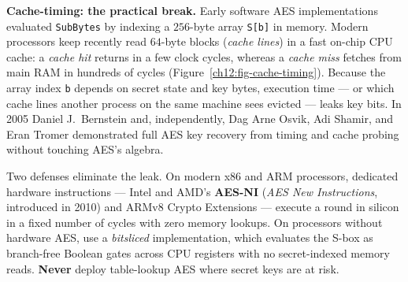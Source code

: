 \begin{attackbox}
\textbf{Cache-timing: the practical break.} Early software AES implementations
evaluated \texttt{SubBytes} by indexing a $256$-byte array \texttt{S[b]} in memory.
Modern processors keep recently read $64$-byte blocks (\emph{cache lines}) in a
fast on-chip CPU cache: a \emph{cache hit} returns in a few clock cycles, whereas a
\emph{cache miss} fetches from main RAM in hundreds of cycles
(Figure~\ref{ch12:fig-cache-timing}). Because the array index \texttt{b} depends on
secret state and key bytes, execution time --- or which cache lines another process
on the same machine sees evicted --- leaks key bits. In 2005 Daniel J.~Bernstein
and, independently, Dag Arne Osvik, Adi Shamir, and Eran Tromer demonstrated full
AES key recovery from timing and cache probing without touching AES's algebra.

Two defenses eliminate the leak. On modern x86 and ARM processors, dedicated
hardware instructions --- Intel and AMD's \textbf{AES-NI} (\emph{AES New
Instructions}, introduced in 2010) and ARMv8 Crypto Extensions --- execute a round
in silicon in a fixed number of cycles with zero memory lookups. On processors
without hardware AES, use a \emph{bitsliced} implementation, which evaluates the
S-box as branch-free Boolean gates across CPU registers with no secret-indexed
memory reads. \textbf{Never} deploy table-lookup AES where secret keys are at risk.
\end{attackbox}

